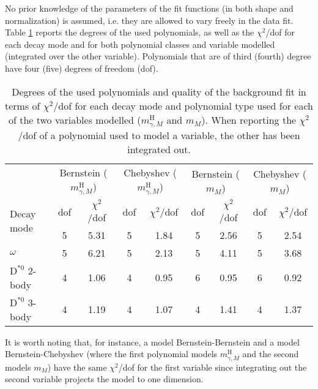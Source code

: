 No prior knowledge of the parameters of the fit functions (in both shape and normalization) is assumed, i.e. they are allowed to vary freely in the data fit. Table \ref{tab:bkg_polynomials} reports the degrees of the used polynomials, as well as the $\chi^2$/dof for each decay mode and for both polynomial classes and variable modelled (integrated over the other variable). Polynomials that are of third (fourth) degree have four (five) degrees of freedom (dof).
\begin{table}[!ht]
    \centering
    \begin{tabular}{|l|cc|cc|cc|cc|}
        \hline
        \cellcolor{lightgray} & \multicolumn{2}{c|}{\cellcolor{lightgray}Bernstein ($m^{\text{H}}_{\gamma, M}$)} & \multicolumn{2}{c|}{\cellcolor{lightgray}Chebyshev ($m^{\text{H}}_{\gamma, M}$)}   & \multicolumn{2}{c|}{\cellcolor{lightgray}Bernstein ($m_{M}$)} & \multicolumn{2}{c|}{\cellcolor{lightgray}Chebyshev ($m_{M}$)} \\
        \multirow{2}{*}[15pt]{\cellcolor{lightgray}Decay mode} & \cellcolor{lightgray}dof & \cellcolor{lightgray}$\chi^2$/dof & \cellcolor{lightgray}dof & \cellcolor{lightgray}$\chi^2$/dof & \cellcolor{lightgray}dof & \cellcolor{lightgray}$\chi^2$/dof & \cellcolor{lightgray}dof & \cellcolor{lightgray}$\chi^2$/dof \\ \hline
        $\phi$                  &5&5.31   &5&1.84     &5&2.56   &5&2.54   \\
        $\omega$                &5&6.21   &5&2.13     &5&4.11   &5&3.68   \\
        $\text{D}^{*0}$ 2-body  &4&1.06   &4&0.95     &6&0.95   &6&0.92   \\
        $\text{D}^{*0}$ 3-body  &4&1.19   &4&1.07     &4&1.41   &4&1.37   \\
        \hline
        \end{tabular}
    \caption{Degrees of the used polynomials and quality of the background fit in terms of $\chi^2$/dof for each decay mode and polynomial type used for each of the two variables modelled ($m^{\text{H}}_{\gamma, M}$ and $m_{M}$). When reporting the $\chi^2$/dof of a polynomial used to model a variable, the other has been integrated out.}
    \label{tab:bkg_polynomials}
\end{table}
It is worth noting that, for instance, a model Bernstein-Bernstein and a model Bernstein-Chebyshev (where the first polynomial models $m^{\text{H}}_{\gamma, M}$ and the second models $m_{M}$) have the same $\chi^2$/dof for the first variable since integrating out the second variable projects the model to one dimension.


